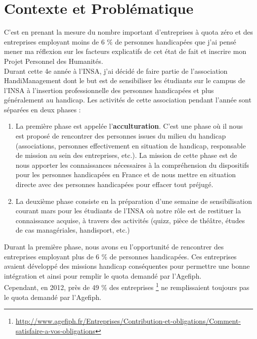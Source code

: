 \section{Contexte et Problématique}
C'est en prenant la mesure du nombre important d'entreprises à quota zéro et  des entreprises employant moins de 6 \% de personnes handicapées que j'ai pensé mener ma réflexion sur les facteurs explicatifs de cet état de fait et inscrire mon Projet Personnel des Humanités. \\

Durant cette 4e année à l'INSA, j'ai décidé de faire partie de l'association HandiManagement dont le but est de sensibiliser les étudiants sur le campus de l'INSA à l'insertion professionnelle des personnes handicapées et plus généralement au handicap. Les activités de cette association pendant l'année sont séparées en deux phases :
\begin{enumerate}
\item La première phase est appelée l'\textbf{acculturation}. C'est une phase où il nous est proposé de rencontrer des personnes issues du milieu du handicap (associations, personnes effectivement en situation de handicap, responsable de mission au sein des entreprises, etc.). La mission de cette phase est de nous apporter les connaissances nécessaires à la compréhension du dispositifs pour les personnes handicapées en France et de nous mettre en situation directe avec des personnes handicapées pour effacer tout préjugé.
\item La deuxième phase consiste en la préparation d'une semaine de sensibilisation courant mars pour les étudiants de l'INSA où notre r\^ole est de restituer la connaissance acquise, à travers des activités (quizz, pièce de thé\^atre, études de cas managériales, handisport, etc.)\\
\end{enumerate}

Durant la première phase, nous avons eu l'opportunité de rencontrer des entreprises employant plus de 6 \% de personnes handicapées. Ces entreprises avaient développé des missions handicap conséquentes pour permettre une bonne intégration et ainsi pour remplir le quota demandé par l'Agefiph.\\

Cependant, en 2012, près de 49 \% des entreprises \footnote{\url{http://www.agefiph.fr/Entreprises/Contribution-et-obligations/Comment-satisfaire-a-vos-obligations}} ne remplissaient toujours pas le quota demandé par l'Agefiph.\\

